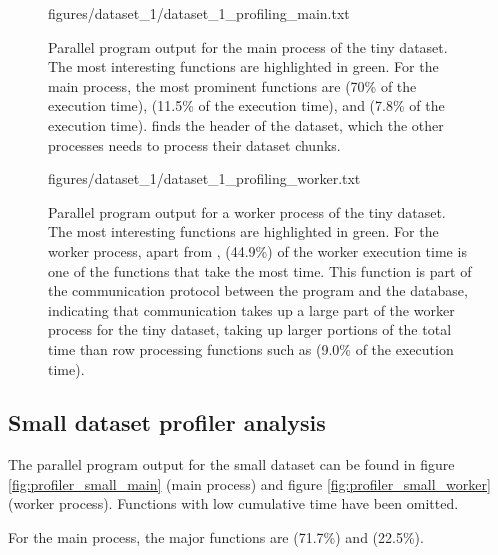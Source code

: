 \begin{figure}[ht]
  \begin{VerbatimInput}{figures/dataset_1/dataset_1_profiling_main.txt}
    \caption[Parallel program  output for the main process of the tiny dataset.]{Parallel program  output for the main process of the tiny dataset.
    The most interesting functions are highlighted in green.
For the main process, the most prominent functions are  (70\% of the execution time),  (11.5\% of
the execution time), and  (7.8\% of the execution time).
   finds the header of the dataset, which the other processes needs to process their dataset chunks.}
  \label{fig:profiler_tiny_main}
\end{VerbatimInput}
\end{figure}

\begin{figure}[ht]
  \begin{VerbatimInput}{figures/dataset_1/dataset_1_profiling_worker.txt}
    \caption[Parallel program  output for a worker process of the tiny dataset.]{Parallel program  output for a worker process of the tiny dataset.
    The most interesting functions are highlighted in green.
For the worker process, apart from ,  (44.9\%) of the worker execution time
is one of the functions that take the most time. This function
is part of the communication protocol between the program and the database, indicating that communication takes up a large part of the
worker process for the tiny dataset, taking up larger portions of the total time than row processing functions such as  (9.0\% of the execution time).}
  \label{fig:profiler_tiny_worker}
\end{VerbatimInput}
\end{figure}

\subsection{Small dataset profiler analysis}
The parallel program  output for the small dataset can be found in figure \ref{fig:profiler_small_main} (main process) and figure \ref{fig:profiler_small_worker}
(worker process). Functions with low cumulative time have been omitted.

For the main process, the major functions are  (71.7\%) and  (22.5\%).

